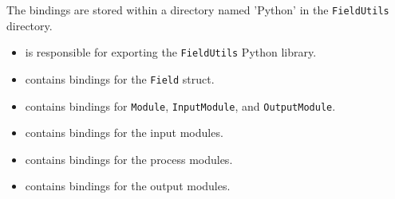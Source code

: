 The bindings are stored within a directory named 'Python' in the \texttt{FieldUtils} directory. 
\begin{itemize}
    \item {} is responsible for exporting the \verb+FieldUtils+ Python library.
    \item {} contains bindings for the \verb+Field+ struct.
    \item {} contains bindings for \verb+Module+, \verb+InputModule+, and \verb+OutputModule+.
    \item {} contains bindings for the input modules.
    \item {} contains bindings for the process modules.
    \item {} contains bindings for the output modules.
\end{itemize}


